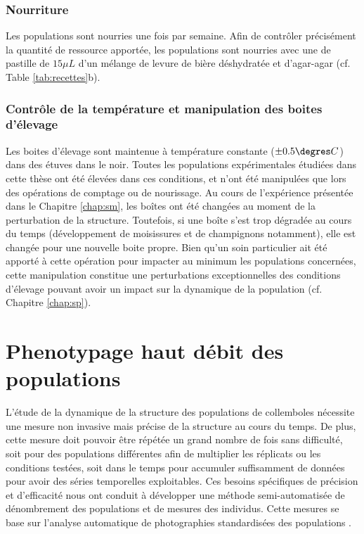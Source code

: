 \subsubsection{Nourriture}

Les populations sont nourries une fois par semaine. Afin de contrôler
précisément la quantité de ressource apportée, les populations sont nourries
avec une de pastille de $15\mu L$ d'un mélange de levure de bière déshydratée et
d'agar-agar (cf. Table \ref{tab:recettes}b).

\subsubsection{Contrôle de la température et manipulation des boites d'élevage}

Les boites d'élevage sont maintenue à température constante ($\pm 0.5\degres C$)
dans des étuves dans le noir. Toutes les populations expérimentales étudiées
dans cette thèse ont été élevées dans ces conditions, et n'ont été manipulées
que lors des opérations de comptage ou de nourissage. Au cours de l'expérience
présentée dans le Chapitre \ref{chap:sm}, les boîtes ont été changées au moment
de la perturbation de la structure. Toutefois, si une boîte s'est trop
dégradée au cours du temps (développement de moisissures et de
champignons notamment), elle est changée pour une nouvelle boite
propre. Bien qu'un soin particulier ait été apporté à cette opération pour
impacter au minimum les populations concernées, cette manipulation constitue une
 perturbations exceptionnelles des conditions d'élevage pouvant avoir un impact
 sur la dynamique de la population (cf. Chapitre \ref{chap:sp}).

\section{Phenotypage haut débit des populations}

L'étude de la dynamique de la structure des populations de collemboles nécessite
une mesure non invasive mais précise de la structure au cours du temps. De plus,
cette mesure doit pouvoir être répétée un grand nombre de fois sans difficulté,
soit pour des populations différentes afin de multiplier les réplicats ou les
conditions testées, soit dans le temps pour accumuler suffisamment de données
pour avoir des séries temporelles exploitables. Ces besoins spécifiques de
précision et d'efficacité nous ont conduit à développer une méthode
semi-automatisée de dénombrement des populations et de mesures des individus.
Cette mesures se base sur l'analyse automatique de photographies standardisées
des populations \autocites[Figure
\ref{fig:photocount}, ][]{mallard2012a,mallard2013a}.

